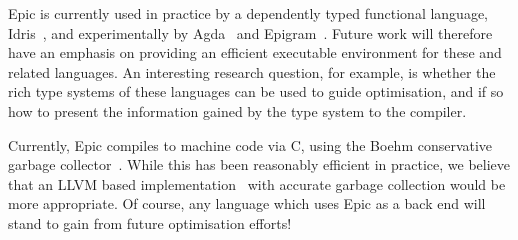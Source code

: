 Epic is currently used in practice by a dependently typed functional
language, Idris~\cite{idris-plpv}, and experimentally by
Agda~\cite{norell-thesis} and Epigram~\cite{levitation}. Future work
will therefore have an emphasis on providing an efficient executable
environment for these and related languages. An interesting research
question, for example, is whether the rich type systems of these languages
can be used to guide optimisation, and if so how to present the
information gained by the type system to the compiler.

Currently, Epic compiles to machine code via C, using the Boehm
conservative garbage collector~\cite{boehm-gc}. While this has been
reasonably efficient in practice, we believe that an LLVM based
implementation~\cite{llvm,llvm-haskell} with accurate garbage
collection would be more appropriate. Of course, any language which
uses Epic as a back end will stand to gain from future optimisation
efforts!
